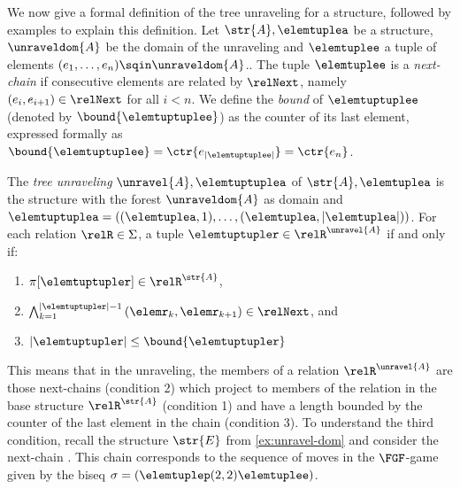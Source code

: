 \noindent
We now give a formal definition of the tree unraveling for a structure, followed by examples to explain this definition.
Let $\str{A}, \elemtuplea$ be a structure, $\unraveldom{A}$ be the domain of the unraveling and $\elemtuplee$ a tuple of elements $(e_{1}, \ldots, e_{n}) \sqin \unraveldom{A}$..
The tuple $\elemtuplee$ is a \emph{next-chain} if consecutive elements are related by $\relNext$, namely $(e_{i}, e_{i+1}) \in \relNext$ for all $i < n$.
We define the \emph{bound} of $\elemtuptuplee$ (denoted by $\bound{\elemtuptuplee}$) as the counter of its last element, expressed formally as $\bound{\elemtuptuplee} = \ctr{e_{|\elemtuptuplee|}} = \ctr{e_{n}}$.
\begin{definition}
The \emph{tree unraveling} $\unravel{A}, \elemtuptuplea$ of $\str{A}, \elemtuplea$ is the structure with the forest $\unraveldom{A}$ as domain and $\elemtuptuplea = ((\elemtuplea, 1), \ldots, (\elemtuplea, |\elemtuplea|))$.
For each relation $\relR \in \Sigma$, a tuple $\elemtuptupler \in \relR^{\unravel{A}}$ if and only if:
\begin{enumerate}
  \item $\pi[\elemtuptupler] \in \relR^{\str{A}}$,
  \item $\bigwedge_{k=1}^{|\elemtuptupler|-1}{(\elemr_{k},\elemr_{k+1}) \in \relNext}$, and
  \item $|\elemtuptupler| \le \bound{\elemtuptupler}$
\end{enumerate}
\end{definition}
This means that in the unraveling, the members of a relation $\relR^{\unravel{A}}$ are those next-chains (condition 2) which project to members of the relation in the base structure $\relR^{\str{A}}$ (condition 1) and have a length bounded by the counter of the last element in the chain (condition 3).
To understand the third condition, recall the structure $\str{E}$ from \cref{ex:unravel-dom} and consider the next-chain .
This chain corresponds to the sequence of moves in the $\FGF$-game given by the biseq $\sigma = (\elemtuplep(2,2)\elemtuplee)$.
